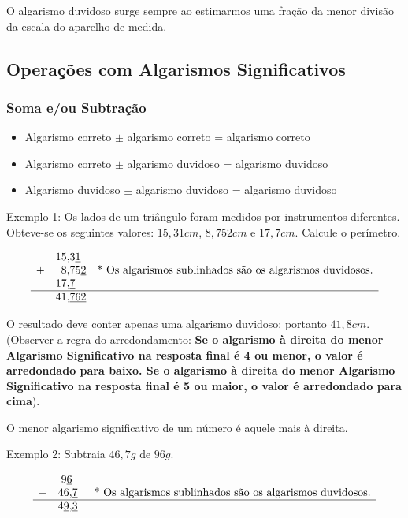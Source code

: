 \documentclass[10pt,a4paper,onecolumn,notitlepage]{scrartcl}
\begin{document}
O algarismo duvidoso surge sempre ao estimarmos uma fração da menor divisão da escala do aparelho de medida.

\subsection{Operações com Algarismos Significativos}

\subsubsection{Soma e/ou Subtração}
\begin{itemize}
\item Algarismo correto $\pm$ algarismo correto = algarismo correto
\item Algarismo correto $\pm$ algarismo duvidoso = algarismo duvidoso
\item Algarismo duvidoso $\pm$ algarismo duvidoso = algarismo duvidoso
\end{itemize} 

Exemplo 1: Os lados de um triângulo foram medidos por instrumentos diferentes. Obteve-se os seguintes valores: $15,31cm$, $8,752cm$ e $17,7cm$. Calcule o perímetro.

\[
\begin{array}{rrlll}
& 15, & \!\!\!\!\!\!3\underline{1} &\\
+ & 8, & \!\!\!\!\!\!75\underline{2} & \text{* Os algarismos sublinhados são os algarismos duvidosos.}\\
& 17, & \!\!\!\!\!\!\underline{7}  & \\
\hline
& 41, & \!\!\!\!\!\!\underline{762} &
\end{array}
\]

O resultado deve conter apenas uma algarismo duvidoso; portanto $41,8cm$. (Observer a regra do arredondamento: \textbf{Se o algarismo à direita do menor Algarismo Significativo na resposta final é 4 ou menor, o valor é arredondado para baixo. Se o algarismo à direita do menor Algarismo Significativo na resposta final é 5 ou maior, o valor é arredondado para cima}).

O menor algarismo significativo de um número é aquele mais à direita.

Exemplo 2: Subtraia $46,7g$ de $96g$.

\[
\begin{array}{rrlll}
& 9\underline{6} &  &\\
+ & 46, & \!\!\!\!\!\!\underline{7} & \text{* Os algarismos sublinhados são os algarismos duvidosos.}\\
\hline
& 4\underline{9}, & \!\!\!\!\!\!\underline{3} &
\end{array}
\]
\end{document}
